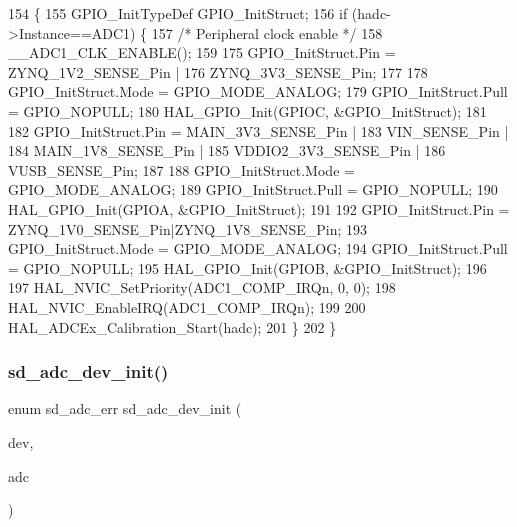 \begin{DoxyCode}
154 \{
155     GPIO\_InitTypeDef GPIO\_InitStruct;
156     \textcolor{keywordflow}{if} (hadc->Instance==ADC1) \{
157         \textcolor{comment}{/* Peripheral clock enable */}
158         \_\_ADC1\_CLK\_ENABLE();
159   
175         GPIO\_InitStruct.Pin = ZYNQ\_1V2\_SENSE\_Pin |
176                       ZYNQ\_3V3\_SENSE\_Pin;
177                       
178         GPIO\_InitStruct.Mode = GPIO\_MODE\_ANALOG;
179         GPIO\_InitStruct.Pull = GPIO\_NOPULL;
180         HAL\_GPIO\_Init(GPIOC, &GPIO\_InitStruct);
181 
182         GPIO\_InitStruct.Pin = MAIN\_3V3\_SENSE\_Pin |
183                       VIN\_SENSE\_Pin |
184                       MAIN\_1V8\_SENSE\_Pin |
185                       VDDIO2\_3V3\_SENSE\_Pin |
186                       VUSB\_SENSE\_Pin;
187     
188         GPIO\_InitStruct.Mode = GPIO\_MODE\_ANALOG;
189         GPIO\_InitStruct.Pull = GPIO\_NOPULL;
190         HAL\_GPIO\_Init(GPIOA, &GPIO\_InitStruct);
191 
192         GPIO\_InitStruct.Pin = ZYNQ\_1V0\_SENSE\_Pin|ZYNQ\_1V8\_SENSE\_Pin;
193         GPIO\_InitStruct.Mode = GPIO\_MODE\_ANALOG;
194         GPIO\_InitStruct.Pull = GPIO\_NOPULL;
195         HAL\_GPIO\_Init(GPIOB, &GPIO\_InitStruct);
196 
197         HAL\_NVIC\_SetPriority(ADC1\_COMP\_IRQn, 0, 0);
198         HAL\_NVIC\_EnableIRQ(ADC1\_COMP\_IRQn);
199         
200         HAL\_ADCEx\_Calibration\_Start(hadc);
201     \}
202 \}
\end{DoxyCode}
\mbox{\label{group___s_d___a_d_c___functions_ga1189f478e64b9aeb4d4ebd4c73e0394e}} 
\subsubsection{\texorpdfstring{sd\+\_\+adc\+\_\+dev\+\_\+init()}{sd\_adc\_dev\_init()}}
{\footnotesize\ttfamily enum sd\+\_\+adc\+\_\+err sd\+\_\+adc\+\_\+dev\+\_\+init (\begin{DoxyParamCaption}\item[{struct \mbox{\hyperlink{structsd__adc__dev}{sd\+\_\+adc\+\_\+dev}} $\ast$}]{dev,  }\item[{A\+D\+C\+\_\+\+Handle\+Type\+Def $\ast$}]{adc }\end{DoxyParamCaption})}



